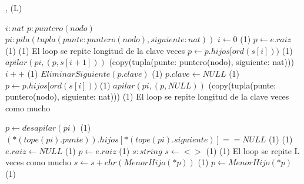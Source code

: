 {   ,
    }
    {}
    {\bigo(L)}
{
    \var $i : nat$
    \var $p : puntero(nodo)$
    \var $pi: pila(tupla(punte: puntero(nodo), siguiente: nat))$
    \State $ i \gets 0$                                                 \comment \bigo(1)
    \State $ p \gets e.raiz$                                            \comment \bigo(1)
                                             \comment \bigo(1)
        \Statex             \comment El loop se repite longitud de la clave veces
        \State $p \gets p.hijos[ord(s[i]))$                             \comment \bigo(1)
        \State $apilar(pi, (p,s[i+1])) $                                \comment \bigo(copy(tupla(punte: puntero(nodo), siguiente: nat)))
        \State $i++$                                                    \comment \bigo(1)
    \EndWhile
    \State $EliminarSiguiente(p.clave)$                                 \comment \bigo(1)
    \State $p.clave \gets NULL$                                         \comment \bigo(1)
    \State $p \gets p.hijos[ord(s[i]))$                                 \comment \bigo(1)
    \State $apilar(pi, (p,NULL)) $                                      \comment \bigo(copy(tupla(punte: puntero(nodo), siguiente: nat)))
                                                                        \comment \bigo(1)
        \Statex             \comment El loop se repite longitud de la clave veces como mucho

        \State $p \gets desapilar(pi)$                                  \comment \bigo(1)
        \State $(*(tope(pi).punte)).hijos[*(tope(pi).siguiente)] == NULL$   \comment \bigo(1)
    \EndWhile
                                          \comment \bigo(1)
        \State $e.raiz \gets NULL$                                      \comment \bigo(1)
    \Else
        \State $ p \gets e.raiz$                                        \comment \bigo(1)
        \var $s : string$
        \State $ s \gets <>$                                            \comment \bigo(1)
                                             \comment \bigo(1)
            \Statex             \comment El loop se repite L veces como mucho
            \State $s \gets s+chr(MenorHijo(*p))$                       \comment \bigo(1)
            \State $p \gets MenorHijo(*p)$                              \comment \bigo(1)

}
